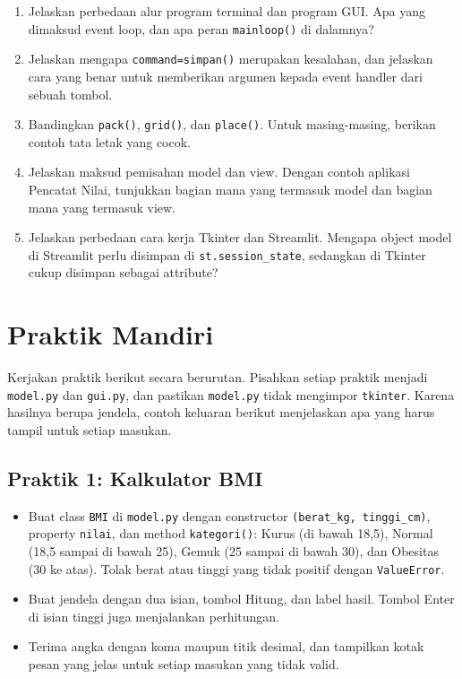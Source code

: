 \begin{enumerate}
  \item Jelaskan perbedaan alur program terminal dan program GUI. Apa yang dimaksud event loop, dan apa peran \texttt{mainloop()} di dalamnya?
  \item Jelaskan mengapa \texttt{command=simpan()} merupakan kesalahan, dan jelaskan cara yang benar untuk memberikan argumen kepada event handler dari sebuah tombol.
  \item Bandingkan \texttt{pack()}, \texttt{grid()}, dan \texttt{place()}. Untuk masing-masing, berikan contoh tata letak yang cocok.
  \item Jelaskan maksud pemisahan model dan view. Dengan contoh aplikasi Pencatat Nilai, tunjukkan bagian mana yang termasuk model dan bagian mana yang termasuk view.
  \item Jelaskan perbedaan cara kerja Tkinter dan Streamlit. Mengapa object model di Streamlit perlu disimpan di \texttt{st.session\_state}, sedangkan di Tkinter cukup disimpan sebagai attribute?
\end{enumerate}

\section{Praktik Mandiri}

Kerjakan praktik berikut secara berurutan. Pisahkan setiap praktik menjadi \texttt{model.py} dan \texttt{gui.py}, dan pastikan \texttt{model.py} tidak mengimpor \texttt{tkinter}. Karena hasilnya berupa jendela, contoh keluaran berikut menjelaskan apa yang harus tampil untuk setiap masukan.

\subsection{Praktik 1: Kalkulator BMI}

\begin{itemize}
  \item Buat class \texttt{BMI} di \texttt{model.py} dengan constructor \texttt{(berat\_kg, tinggi\_cm)}, property \texttt{nilai}, dan method \texttt{kategori()}: Kurus (di bawah 18,5), Normal (18,5 sampai di bawah 25), Gemuk (25 sampai di bawah 30), dan Obesitas (30 ke atas). Tolak berat atau tinggi yang tidak positif dengan \texttt{ValueError}.
  \item Buat jendela dengan dua isian, tombol Hitung, dan label hasil. Tombol Enter di isian tinggi juga menjalankan perhitungan.
  \item Terima angka dengan koma maupun titik desimal, dan tampilkan kotak pesan yang jelas untuk setiap masukan yang tidak valid.
\end{itemize}

